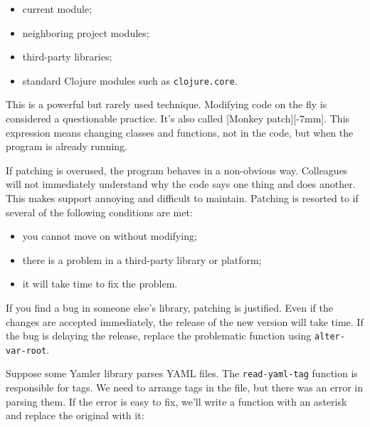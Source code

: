 \begin{itemize}

\item
  current module;

\item
  neighboring project modules;

\item
  third-party libraries;

\item
  standard Clojure modules such as \texttt{clo\-ju\-re.co\-re}.

\end{itemize}


This is a powerful but rarely used technique.
Modifying code on the fly is considered a questionable practice.
It's also called [Monkey patch][-7mm]. This expression means changing classes and functions, not in the code, but when the program is already running.

If patching is overused, the program behaves in a non-obvious way.
Colleagues will not immediately understand why the code says one thing and does another.
This makes support annoying and difficult to maintain. Patching is resorted to if several of the following conditions are met:

\begin{itemize}

\item
  you cannot move on without modifying;

\item
  there is a problem in a third-party library or platform;

\item
  it will take time to fix the problem.

\end{itemize}

If you find a bug in someone else's library, patching is justified.
Even if the changes are accepted immediately, the release of the new version will take time.
If the bug is delaying the release, replace the problematic function using \verb|alter-var-root|.

Suppose some Yamler library parses YAML files.
The \verb|read-yaml-tag| function is responsible for tags.
We need to arrange tags in the file, but there was an error in parsing them.
If the error is easy to fix, we'll write a function with an asterisk and replace the original with it:

